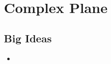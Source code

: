 \chapter{Complex Plane}
\label{chap:CP}

\section{Big Ideas}
\label{sec:CP Big Ideas}
\begin{itemize}
  \item 
\end{itemize}